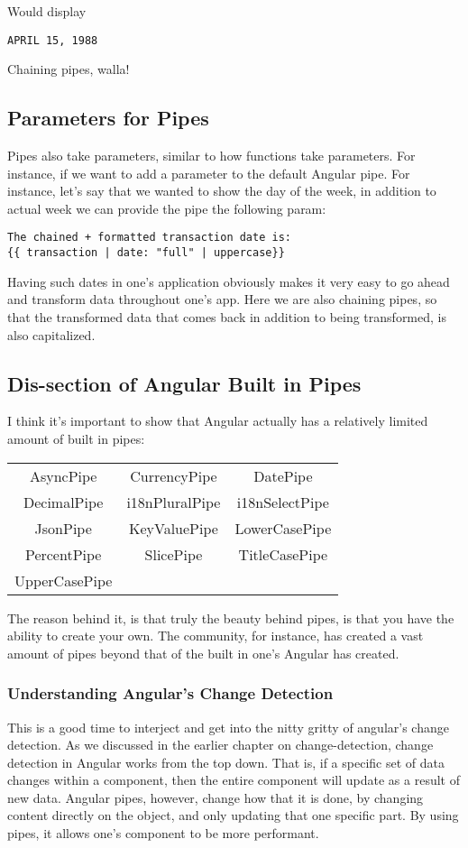 Would display
\begin{verbatim}
APRIL 15, 1988
\end{verbatim}

Chaining pipes, walla!

\subsection{Parameters for Pipes}
Pipes also take parameters, similar to how functions take parameters. For
instance, if we want to add a parameter to the default Angular pipe. For
instance, let's say that we wanted to show the day of the week, in addition to
actual week we can provide the pipe the following param:

\begin{lstlisting}
The chained + formatted transaction date is:
{{ transaction | date: "full" | uppercase}}
\end{lstlisting}

Having such dates in one's application obviously makes it very easy to go ahead
and transform data throughout one's app. Here we are also chaining pipes, so
that the transformed data that comes back in addition to being transformed, is
also capitalized.

\subsection{ Dis-section of Angular Built in Pipes }
I think it's important to show that Angular actually has a relatively limited
amount of built in pipes:
\begin{center}
\begin{tabular}{ c c c }
 AsyncPipe & CurrencyPipe & DatePipe \\
 DecimalPipe & i18nPluralPipe & i18nSelectPipe \\
 JsonPipe & KeyValuePipe & LowerCasePipe \\
 PercentPipe & SlicePipe & TitleCasePipe \\
 UpperCasePipe
\end{tabular}
\end{center}

The reason behind it, is that truly the beauty behind pipes, is that you have
the ability to create your own. The community, for instance, has created a vast
amount of pipes beyond that of the built in one's Angular has created.

\subsubsection{ Understanding Angular's Change Detection }
This is a good time to interject and get into the nitty gritty of angular's
change detection. As we discussed in the earlier chapter on change-detection,
change detection in Angular works from the top down. That is, if a specific set
of data changes within a component, then the entire component will update as a
result of new data. Angular pipes, however, change how that it is done, by
changing content directly on the object, and only updating that one specific
part. By using pipes, it allows one's component to be more performant.

